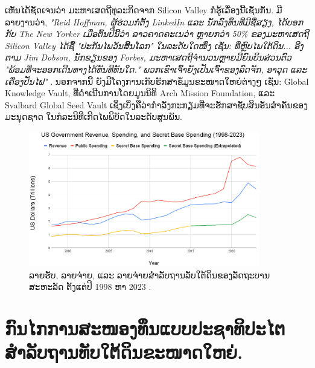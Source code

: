 \documentclass[10pt,twocolumn,letterpaper]{article}
\begin{document}
ເຫັນໄດ້ຊັດເຈນວ່າ ມະຫາເສດຖີທຸລະກິດຈາກ Silicon Valley ກໍຮູ້ເລື່ອງນີ້ເຊັ່ນກັນ. 
ມີລາຍງານວ່າ, \textit{"Reid Hoffman, ຜູ້ຮ່ວມກໍ່ຕັ້ງ LinkedIn ແລະ ນັກລົງທຶນທີ່ມີຊື່ສຽງ, ໄດ້ບອກກັບ The New Yorker ເມື່ອຕົ້ນປີນີ້ວ່າ ລາວຄາດຄະເນວ່າ ຫຼາຍກວ່າ 50\% ຂອງມະຫາເສດຖີ Silicon Valley ໄດ້ຊື້ "ປະກັນໄພວັນສິ້ນໂລກ" ໃນລະດັບໃດໜຶ່ງ ເຊັ່ນ: ທີ່ຫຼົບໄພໃຕ້ດິນ... ອີງຕາມ Jim Dobson, ນັກຂຽນຂອງ Forbes, ມະຫາເສດຖີຈໍານວນຫຼາຍມີຍົນບິນສ່ວນຕົວ "ພ້ອມທີ່ຈະອອກເດີນທາງໄດ້ທັນທີທັນໃດ." ພວກເຂົາເຈົ້າຍັງເປັນເຈົ້າຂອງລົດຈັກ, ອາວຸດ ແລະ ເຄື່ອງປັ່ນໄຟ"} \cite{28}. 
ນອກຈາກນີ້ ຍັງມີໂຄງການເກັບຮັກສາຂໍ້ມູນຂະໜາດໃຫຍ່ຕ່າງໆ ເຊັ່ນ: Global Knowledge Vault, ທີ່ດໍາເນີນການໂດຍມູນນິທິ Arch Mission Foundation, \cite{29} ແລະ Svalbard Global Seed Vault \cite{30} ເຊິ່ງເບິ່ງຄືວ່າກໍາລັງກະກຽມທີ່ຈະຮັກສາຊັບສິນອັນສໍາຄັນຂອງມະນຸດຊາດ ໃນກໍລະນີທີ່ເກີດໄພພິບັດໃນລະດັບສູນພັນ. 
\begin{figure}[t]
\begin{center}
\includegraphics[width=0.9\textwidth]{govcrop2.png}
\end{center}
   \caption{ລາຍຮັບ, ລາຍຈ່າຍ, ແລະ ລາຍຈ່າຍສໍາລັບຖານລັບໃຕ້ດິນຂອງລັດຖະບານສະຫະລັດ ຕັ້ງແຕ່ປີ 1998 ຫາ 2023 \cite{19}.}
   \label{fig:9}
\end{figure}

\section{ກົນໄກການສະໜອງທຶນແບບປະຊາທິປະໄຕ ສຳລັບຖານທັບໃຕ້ດິນຂະໜາດໃຫຍ່.}
\end{document}

